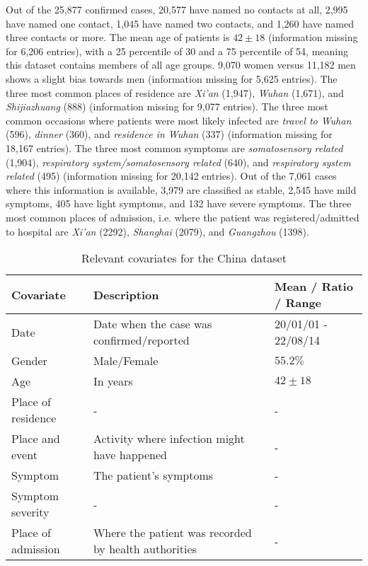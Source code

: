 Out of the 25,877 confirmed cases, 20,577 have named no contacts at all, 2,995 have named one contact, 1,045 have named two contacts, and 1,260 have named three contacts or more. The mean age of patients is $42\pm18$ (information missing for 6,206 entries), with a 25 percentile of 30 and a 75 percentile of 54, meaning this dataset contains members of all age groups. 9,070 women versus 11,182 men shows a slight bias towards men (information missing for 5,625 entries). The three most common places of residence are \emph{Xi'an} (1,947), \emph{Wuhan} (1,671), and \emph{Shijiazhuang} (888) (information missing for 9,077 entries). The three most common occasions where patients were most likely infected are \emph{travel to Wuhan} (596), \emph{dinner} (360), and \emph{residence in Wuhan} (337) (information missing for 18,167 entries). The three most common symptoms are \emph{somatosensory related} (1,904), \emph{respiratory system/somatosensory related} (640), and \emph{respiratory system related} (495) (information missing for 20,142 entries). Out of the 7,061 cases where this information is available, 3,979 are classified as stable, 2,545 have mild symptoms, 405 have light symptoms, and 132 have severe symptoms. The three most common places of admission, i.e. where the patient was registered/admitted to hospital are \emph{Xi'an} (2292), \emph{Shanghai} (2079), and \emph{Guangzhou} (1398).

\begin{table}
	\begin{tabularx}{\linewidth}{XXX}
		\hline
		\textbf{Covariate} & \textbf{Description} & \textbf{Mean / Ratio / Range}\\
		\hline
		Date & Date when the case was confirmed/reported & 20/01/01 - 22/08/14\\
		Gender & Male/Female & $55.2\%$ \\
		Age & In years & $42\pm18$ \\
		Place of residence & - & -\\
		Place and event & Activity where infection might have happened & - \\
		Symptom & The patient's symptoms & - \\
		Symptom severity & - & - \\
		Place of admission & Where the patient was recorded by health authorities & - \\
		\hline
	\end{tabularx}
	\caption{Relevant covariates for the China dataset}
	\label{tab:china_covariates}
\end{table}

